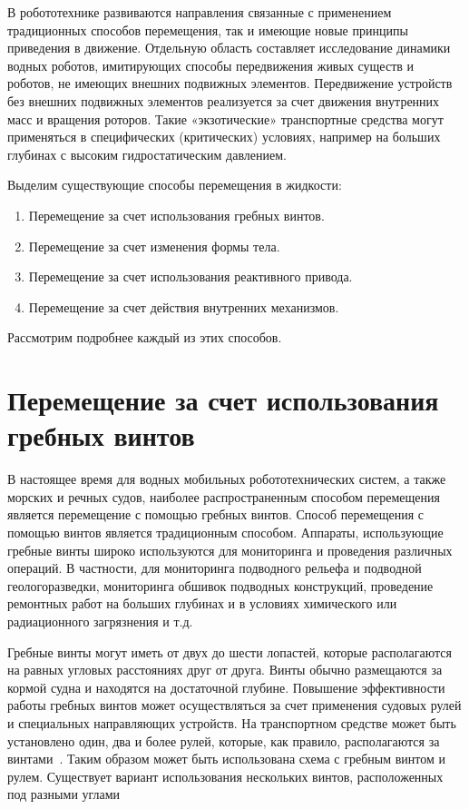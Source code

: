 В робототехнике развиваются направления связанные с применением традиционных способов перемещения, так и имеющие новые принципы приведения в движение. Отдельную область составляет исследование динамики водных роботов, имитирующих способы передвижения живых существ и роботов, не имеющих внешних подвижных элементов. Передвижение устройств без внешних подвижных элементов реализуется за счет движения внутренних масс и вращения роторов. Такие «экзотические» транспортные средства могут применяться в специфических (критических) условиях, например на больших глубинах с высоким гидростатическим давлением.

Выделим существующие способы перемещения в жидкости:

\begin{enumerate}
	\item Перемещение за счет использования гребных винтов.
	\item Перемещение за счет изменения формы тела.
	\item Перемещение за счет использования реактивного привода.
	\item Перемещение за счет действия внутренних механизмов.
\end{enumerate}

Рассмотрим подробнее каждый из этих способов.

\section{Перемещение за счет использования гребных винтов}\label{sec:ch1/sec2}

В настоящее время для водных мобильных робототехнических систем, а также морских и речных судов, наиболее распространенным способом перемещения является перемещение с помощью гребных винтов. Способ перемещения с помощью винтов является традиционным способом. Аппараты, использующие гребные винты широко используются для мониторинга и проведения различных операций. В частности, для мониторинга подводного рельефа и подводной геологоразведки, мониторинга обшивок подводных конструкций, проведение ремонтных работ на больших глубинах и в условиях химического или радиационного загрязнения и т.д. 

Гребные винты могут иметь от двух до шести лопастей, которые располагаются на равных угловых расстояниях друг от друга. Винты обычно размещаются за кормой судна и находятся на достаточной глубине. Повышение эффективности работы гребных винтов может осуществляться за счет применения судовых рулей и специальных направляющих устройств. На транспортном средстве может быть установлено один, два и более рулей, которые, как правило, располагаются за винтами~\cite{Basin_Anfimov_1961}. Таким образом может быть использована схема с гребным винтом и рулем. Существует вариант использования нескольких винтов, расположенных под разными углами~\cite{Lebedev_Pershits_1969, Gornak_MMT3000}

